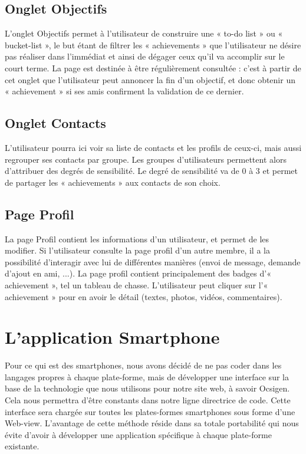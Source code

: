 \documentclass{life-fr}
\begin{document}
\subsection{Onglet Objectifs}

L'onglet Objectifs permet à l'utilisateur de construire une « to-do list » ou « bucket-list », le but étant de filtrer les « achievements » que l'utilisateur ne désire pas réaliser dans l'immédiat et ainsi de dégager ceux qu'il va accomplir sur le court terme. La page est destinée à être régulièrement consultée : c'est à partir de cet onglet que l'utilisateur peut annoncer la fin d'un objectif, et donc obtenir un « achievement » si ses amis confirment la validation de ce dernier.

\subsection{Onglet Contacts}

L'utilisateur pourra ici voir sa liste de contacts et les profils de ceux-ci, mais aussi regrouper ses contacts par groupe. Les groupes d'utilisateurs permettent alors d'attribuer des degrés de sensibilité.
Le degré de sensibilité va de 0 à 3 et permet de partager les « achievements » aux contacts de son choix.

\subsection{Page Profil}
La page Profil contient les informations d'un utilisateur, et permet de les modifier. Si l'utilisateur consulte la page profil d'un autre membre, il a la possibilité d'interagir avec lui de différentes manières (envoi de message, demande d'ajout en ami, ...).
La page profil contient principalement des badges d'« achievement », tel un tableau de chasse. L'utilisateur peut cliquer sur l'« achievement » pour en avoir le détail (textes, photos, vidéos, commentaires).

\section{L'application Smartphone}
Pour ce qui est des smartphones, nous avons décidé de ne pas coder dans les langages propres à chaque plate-forme, mais de développer une interface sur la base de la technologie que nous utilisons pour notre site web, à savoir Ocsigen. Cela nous permettra d'être constants dans notre ligne directrice de code. Cette interface sera chargée sur toutes les plates-formes smartphones sous forme d'une Web-view. L'avantage de cette méthode réside dans sa totale portabilité qui nous évite d'avoir à développer une application spécifique à chaque plate-forme existante.
\end{document}
